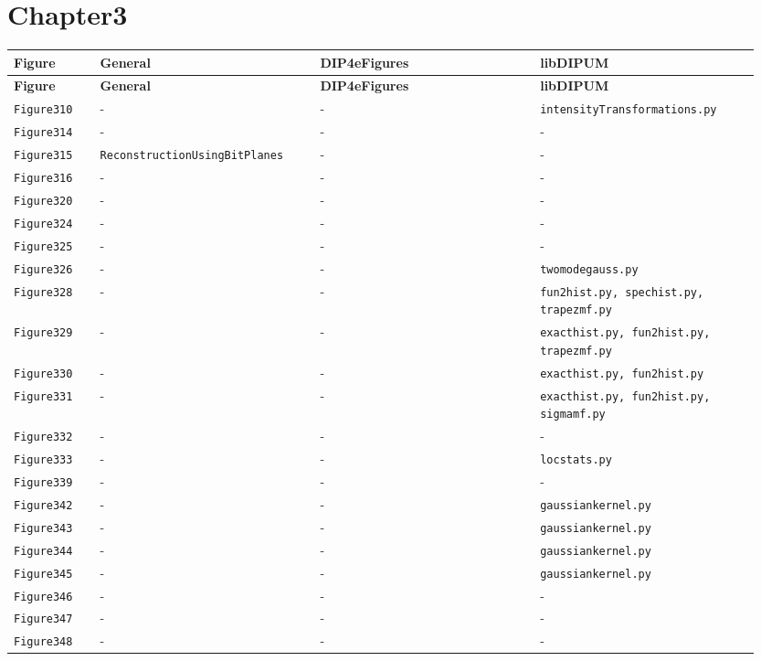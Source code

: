 \documentclass[10pt]{article}
\begin{document}
\section*{Chapter3}
\setlength{\tabcolsep}{4pt}
\begin{longtable}{p{0.11\linewidth} p{0.28\linewidth} p{0.28\linewidth} p{0.28\linewidth}}
\toprule
\textbf{Figure} & \textbf{General} & \textbf{DIP4eFigures} & \textbf{libDIPUM} \\
\midrule
\endfirsthead
\toprule
\textbf{Figure} & \textbf{General} & \textbf{DIP4eFigures} & \textbf{libDIPUM} \\
\midrule
\endhead
\bottomrule
\endfoot
\texttt{Figure310} & - & - & \texttt{intensityTransformations.py} \\
\texttt{Figure314} & - & - & - \\
\texttt{Figure315} & \texttt{ReconstructionUsingBitPlanes} & - & - \\
\texttt{Figure316} & - & - & - \\
\texttt{Figure320} & - & - & - \\
\texttt{Figure324} & - & - & - \\
\texttt{Figure325} & - & - & - \\
\texttt{Figure326} & - & - & \texttt{twomodegauss.py} \\
\texttt{Figure328} & - & - & \texttt{fun2hist.py, spechist.py, trapezmf.py} \\
\texttt{Figure329} & - & - & \texttt{exacthist.py, fun2hist.py, trapezmf.py} \\
\texttt{Figure330} & - & - & \texttt{exacthist.py, fun2hist.py} \\
\texttt{Figure331} & - & - & \texttt{exacthist.py, fun2hist.py, sigmamf.py} \\
\texttt{Figure332} & - & - & - \\
\texttt{Figure333} & - & - & \texttt{locstats.py} \\
\texttt{Figure339} & - & - & - \\
\texttt{Figure342} & - & - & \texttt{gaussiankernel.py} \\
\texttt{Figure343} & - & - & \texttt{gaussiankernel.py} \\
\texttt{Figure344} & - & - & \texttt{gaussiankernel.py} \\
\texttt{Figure345} & - & - & \texttt{gaussiankernel.py} \\
\texttt{Figure346} & - & - & - \\
\texttt{Figure347} & - & - & - \\
\texttt{Figure348} & - & - & - \\

\end{longtable}
\end{document}
